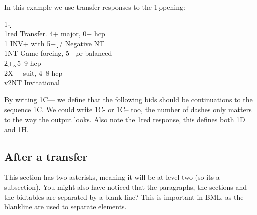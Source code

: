 \documentclass[a4paper]{article}
\begin{document}
In this example we use transfer responses to the 1\c\ opening:

\begin{bidtable}
1\c---\\
1red \> Transfer. 4+ major, 0+ hcp\\
1\s \> INV+ with 5+\d\ / Negative NT\\
1NT \> Game forcing, 5+\c\ or balanced\\
2\c {}+\c, 5--9 hcp\\
2X + suit, 4--8 hcp\\
v2NT \> Invitational
\end{bidtable}

By writing 1C--- we define that the following bids should be
continuations to the sequence 1C. We could write 1C- or 1C-- too,
the number of dashes only matters to the way the output looks. Also
note the 1red response, this defines both 1D and 1H.

\subsection{After a transfer}

This section has two asterisks, meaning it will be at level two
(so its a subsection). You might also have noticed that the
paragraphs, the sections and the bidtables are separated by a
blank line? This is important in BML, as the blankline are used to
separate elements.
\end{document}
